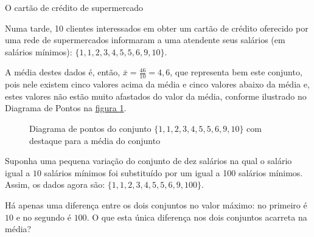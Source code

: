 \begin{example}{O cartão de crédito de supermercado}
\label{cartao-credito}

Numa tarde, 10 clientes interessados em obter um cartão de crédito oferecido por uma rede de supermercados informaram a uma atendente seus salários (em salários mínimos): \(\{1, 1, 2, 3, 4, 5, 5, 6, 9, 10\}\).

A média destes dados é, então, \(\bar{x}=\frac{46}{10}=4,6\), que representa bem este conjunto, pois nele existem cinco valores acima da média e cinco valores abaixo da média e, estes valores não estão muito afastados do valor da média, conforme ilustrado no Diagrama de Pontos na \hyperref[\detokenize{PE104-1:id12}]{figura \ref{\detokenize{PE104-1:id12}}}.

\begin{figure}[H]
\centering
\capstart

\caption{Diagrama de pontos do conjunto \(\{1, 1, 2, 3, 4, 5, 5, 6, 9, 10\}\) com destaque para a média do conjunto}\label{\detokenize{PE104-1:fig-diagramadepontos-media-sem-outlier}}\label{\detokenize{PE104-1:id12}}\end{figure}

Suponha uma pequena variação do conjunto de dez salários na qual o salário igual a $10$ salários mínimos foi substituído por um igual a 100 salários mínimos. Assim, os dados agora são: \(\{1, 1, 2, 3, 4, 5, 5, 6, 9, 100\}\).

Há apenas uma diferença entre os dois conjuntos no valor máximo: no primeiro é $10$ e no segundo é $100$. O que esta única diferença nos dois conjuntos acarreta na média?


\end{example}
